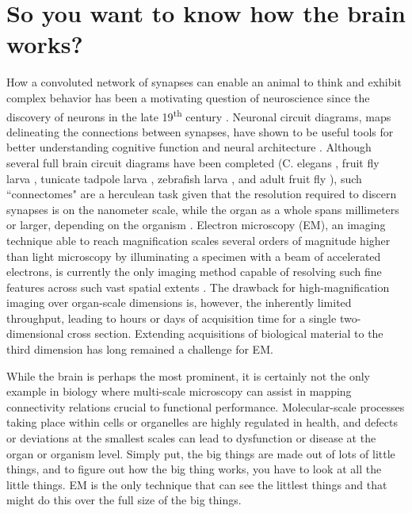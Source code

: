 \section{So you want to know how the brain works?}
\label{sec:1_brain}

How a convoluted network of synapses can enable an animal to think and exhibit complex behavior has been a motivating question of neuroscience since the discovery of neurons in the late 19\textsuperscript{th} century \cite{ramon1899textura, finger2001origins}. Neuronal circuit diagrams, maps delineating the connections between synapses, have shown to be useful tools for better understanding cognitive function and neural architecture \cite{helmstaedter20083d, kasthuri2015saturated}. Although several full brain circuit diagrams have been completed (C. elegans \cite{white1986structure}, fruit fly larva \cite{ohyama2015multilevel}, tunicate tadpole larva \cite{ryan2016cns}, zebrafish larva \cite{hildebrand2017whole}, and adult fruit fly \cite{zheng2018complete}), such ``connectomes" are a herculean task given that the resolution required to discern synapses is on the nanometer scale, while the organ as a whole spans millimeters or larger, depending on the organism \cite{lichtman2008ome, bock2011network, kornfeld2018progress}. Electron microscopy (EM), an imaging technique able to reach magnification scales several orders of magnitude higher than light microscopy by illuminating a specimen with a beam of accelerated electrons, is currently the only imaging method capable of resolving such fine features across such vast spatial extents \cite{helmstaedter20083d, zheng2018complete}. The drawback for high-magnification imaging over organ-scale dimensions is, however, the inherently limited throughput, leading to hours or days of acquisition time for a single two-dimensional cross section. Extending acquisitions of biological material to the third dimension has long remained a challenge for EM.

While the brain is perhaps the most prominent, it is certainly not the only example in biology where multi-scale microscopy can assist in mapping connectivity relations crucial to functional performance. Molecular-scale processes taking place within cells or organelles are highly regulated in health, and defects or deviations at the smallest scales can lead to dysfunction or disease at the organ or organism level. Simply put, the big things are made out of lots of little things, and to figure out how the big thing works, you have to look at all the little things. EM is the only technique that can see the littlest things and that might do this over the full size of the big things.

